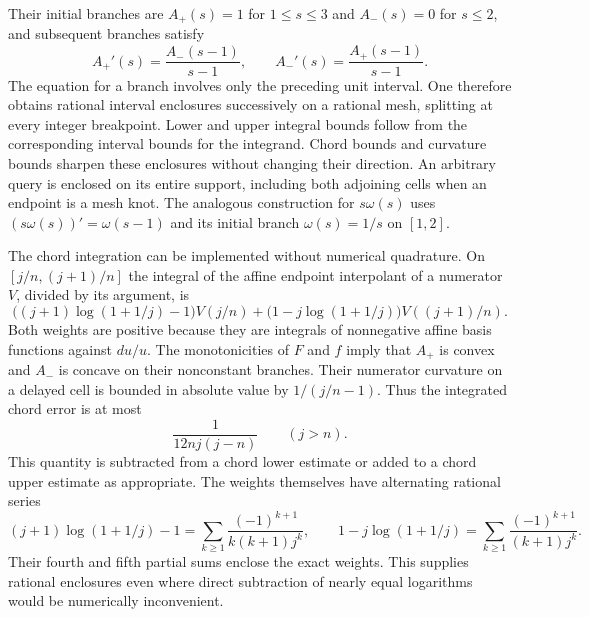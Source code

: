 Their initial branches are $A_+(s)=1$ for $1\le s\le3$ and
$A_-(s)=0$ for $s\le2$, and subsequent branches satisfy
\[
 A_+'(s)=\frac{A_-(s-1)}{s-1},\qquad
 A_-'(s)=\frac{A_+(s-1)}{s-1}.
\]
The equation for a branch involves only the preceding unit interval.
One therefore obtains rational interval enclosures successively on a
rational mesh, splitting at every integer breakpoint.  Lower and upper
integral bounds follow from the corresponding interval bounds for the
integrand.  Chord bounds and curvature bounds sharpen these enclosures
without changing their direction.  An arbitrary query is enclosed on
its entire support, including both adjoining cells when an endpoint
is a mesh knot.  The analogous construction for $s\omega(s)$ uses
$(s\omega(s))'=\omega(s-1)$ and its initial branch
$\omega(s)=1/s$ on $[1,2]$.

The chord integration can be implemented without numerical
quadrature.  On $[j/n,(j+1)/n]$ the integral of the affine
endpoint interpolant of a numerator $V$, divided by its argument,
is
\[
 \bigl((j+1)\log(1+1/j)-1\bigr)V(j/n)
 +\bigl(1-j\log(1+1/j)\bigr)V((j+1)/n).
\]
Both weights are positive because they are integrals of
nonnegative affine basis functions against $du/u$.
The monotonicities of $F$ and $f$ imply that $A_+$ is convex
and $A_-$ is concave on their nonconstant branches.
Their numerator curvature on a delayed cell is bounded
in absolute value by $1/(j/n-1)$.  Thus the integrated
chord error is at most
\[
 \frac{1}{12nj(j-n)}\qquad(j>n).
\]
This quantity is subtracted from a chord lower estimate
or added to a chord upper estimate as appropriate.
The weights themselves have alternating rational series
\[
 (j+1)\log(1+1/j)-1
  =\sum_{k\ge1}\frac{(-1)^{k+1}}{k(k+1)j^k},\qquad
 1-j\log(1+1/j)
  =\sum_{k\ge1}\frac{(-1)^{k+1}}{(k+1)j^k}.
\]
Their fourth and fifth partial sums enclose the exact
weights.  This supplies rational enclosures even where
direct subtraction of nearly equal logarithms would be
numerically inconvenient.

